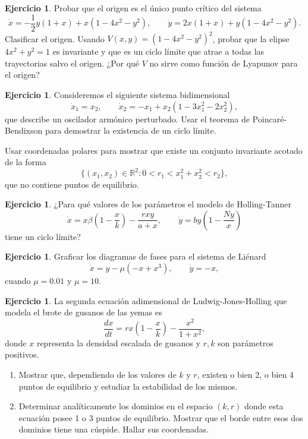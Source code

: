 \documentclass[12pt, a4paper]{amsbook}
\newcommand{\R}{{\mathbb R}}
\theoremstyle{remark}
\theoremstyle{definition}
\newtheorem{ejer}[teo]{Ejercicio}
\numberwithin{section}{chapter}
\numberwithin{subsection}{section}
\numberwithin{equation}{section}
\numberwithin{figure}{chapter}
\begin{document}
\begin{ejer}
Probar que el origen es el único punto crítico del sistema
$$
\dot x = -\frac12 y(1 + x) + x(1 - 4x^2 - y^2),\qquad \dot y = 2x(1 + x) + y(1 - 4x^2 - y^2).
$$
Clasificar el origen. Usando $V(x, y) = (1 - 4x^2 - y^2)^2$, probar que la elipse $4x^2+y^2=1$ es invariante y que es un ciclo límite que atrae a todas las trayectorias salvo el origen. ¿Por qué $V$ no sirve como función de Lyapunov para el origen?
\end{ejer}

\begin{ejer}
Consideremos el siguiente sistema bidimensional
$$
\dot x_1 = x_2,\qquad \dot x_2 = -x_1 + x_2 (1- 3x_1^2 - 2x_2^2),
$$
que describe un oscilador armónico perturbado. Usar el teorema de Poincaré-Bendixson para demostrar la existencia de un ciclo límite.

 Usar coordenadas polares para mostrar que existe un conjunto invariante acotado de la forma
$$
\{(x_1,x_2)\in \R^2\colon 0<r_1<x_1^2+x_2^2<r_2\},
$$
que no contiene puntos de equilibrio.
\end{ejer}

\begin{ejer}
¿Para qué valores de los parámetros el modelo de Holling-Tanner
$$
\dot x = x \beta \left(1 - \frac{x}{k}\right) - \frac{rxy}{a + x},\qquad \dot y = by \left(1 - \frac{Ny}{x}\right)
$$
tiene un ciclo límite?
\end{ejer}

\begin{ejer}
Graficar los diagramas de fases para el sistema de Liénard
$$
\dot x  = y - \mu (-x + x^3),\qquad  \dot y = -x,
$$
cuando $\mu=0.01$ y $\mu=10$.
\end{ejer}

\begin{ejer}
La segunda ecuación adimensional de Ludwig-Jones-Holling que modela el brote de gusanos de las yemas es
$$
\frac{dx}{dt} = rx\left(1-\frac{x}{k}\right) - \frac{x^2}{1+x^2},
$$
donde $x$ representa la densidad escalada de gusanos y $r, k$ son parámetros positivos.
\begin{enumerate}
\item Mostrar que, dependiendo de los valores de $k$ y $r$, existen o bien 2, o bien 4 puntos de equilibrio y estudiar la estabilidad de los mismos.
\item Determinar analíticamente los dominios en el espacio $(k,r)$ donde esta ecuación posee 1 o 3 puntos de equilibrio. Mostrar que el borde entre esos dos dominios tiene una cúspide. Hallar sus coordenadas.
\end{enumerate}
\end{ejer}
\end{document}
